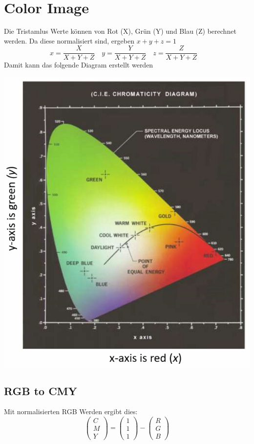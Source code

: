 \section{Color Image}
Die Tristamlus Werte können von Rot (X), Grün (Y) und Blau (Z) berechnet werden. Da diese normalisiert sind, ergeben $x+y+z=1$
\[
x = \frac{X}{X+Y+Z} \quad 
y = \frac{Y}{X+Y+Z} \quad 
z = \frac{Z}{X+Y+Z} \quad 
\]
Damit kann das folgende Diagram erstellt werden
\begin{center}
	\includegraphics[width=\columnwidth]{Images/cie}
\end{center}

\subsection{RGB to CMY}
Mit normalisierten RGB Werden ergibt dies:
\[
\begin{pmatrix}
	C \\ M \\ Y
\end{pmatrix} = \begin{pmatrix}
1 \\ 1 \\ 1
\end{pmatrix} -  \begin{pmatrix}
R \\ G \\ B
\end{pmatrix}
\]

